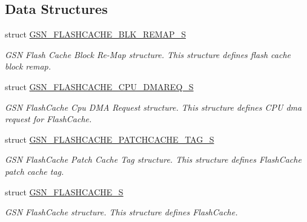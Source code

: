 \subsection*{Data Structures}
\begin{DoxyCompactItemize}
\item 
struct \hyperlink{a00074}{GSN\_\-FLASHCACHE\_\-BLK\_\-REMAP\_\-S}
\begin{DoxyCompactList}\small\item\em GSN Flash Cache Block Re-\/Map structure. This structure defines flash cache block remap. \end{DoxyCompactList}\item 
struct \hyperlink{a00075}{GSN\_\-FLASHCACHE\_\-CPU\_\-DMAREQ\_\-S}
\begin{DoxyCompactList}\small\item\em GSN FlashCache Cpu DMA Request structure. This structure defines CPU dma request for FlashCache. \end{DoxyCompactList}\item 
struct \hyperlink{a00076}{GSN\_\-FLASHCACHE\_\-PATCHCACHE\_\-TAG\_\-S}
\begin{DoxyCompactList}\small\item\em GSN FlashCache Patch Cache Tag structure. This structure defines FlashCache patch cache tag. \end{DoxyCompactList}\item 
struct \hyperlink{a00077}{GSN\_\-FLASHCACHE\_\-S}
\begin{DoxyCompactList}\small\item\em GSN FlashCache structure. This structure defines FlashCache. \end{DoxyCompactList}\end{DoxyCompactItemize}
